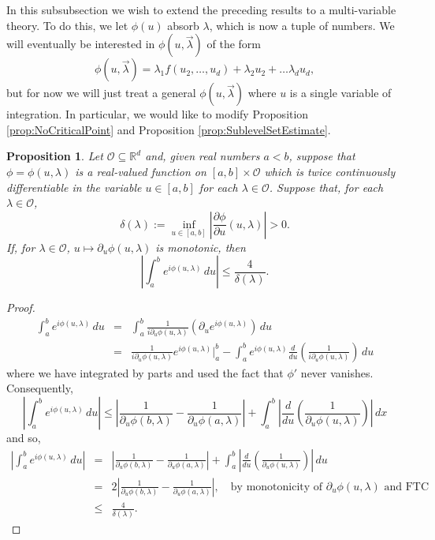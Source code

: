 \documentclass[11pt]{article}
\newtheorem{proposition}[theorem]{Proposition}
\newcommand{\lp}{\left(}
\newcommand{\rp}{\right)}
\newcommand{\p}{\partial}
\newcommand{\f}[2]{\frac{#1}{#2}}
\begin{document}
In this subsubsection we wish to extend the preceding results to a multi-variable theory. To do this, we let $\phi(u)$ absorb $\lambda$, which is now a tuple of numbers. We will eventually be interested in $\phi(u,\vec{\lambda})$ of the form
\begin{equation*}
    \phi(u,\vec{\lambda}) = \lambda_1 f(u_2,\dots,u_d) + \lambda_2 u_2 + \dots \lambda_d u_d,
\end{equation*}
but for now we will just treat a general $\phi(u,\vec{\lambda})$ where $u$ is a single variable of integration. In particular, we would like to modify Proposition \ref{prop:NoCriticalPoint} and Proposition \ref{prop:SublevelSetEstimate}.

\begin{proposition}\label{prop:LambdaNoCriticalPoint} 
Let $\mathcal{O}\subseteq\mathbb{R}^d$ and, given real numbers $a<b$, suppose that $\phi=\phi(u,\lambda)$ is a real-valued function on $[a,b]\times\mathcal{O}$ which is twice continuously differentiable in the variable $u\in [a,b]$ for each $\lambda\in\mathcal{O}$. Suppose that, for each $\lambda\in\mathcal{O}$,
\begin{equation*}
    \delta(\lambda):=\inf_{u\in[a,b]}\left|\frac{\partial \phi}{\partial u}(u,\lambda)\right|>0.
\end{equation*}
If, for $\lambda\in\mathcal{O}$, $u\mapsto \partial_u \phi (u,\lambda)$ is monotonic, then
\begin{equation*}
    \left|\int_a^b e^{i\phi(u,\lambda)}\,du\right|\leq \frac{4}{\delta(\lambda)}.
\end{equation*}
\end{proposition}


\begin{proof}
\begin{eqnarray*}
    \int_{a}^b e^{i \phi(u,\lambda)}\,du  
    &=& \int_{a}^b   \f{1}{i \p_u\phi(u, \lambda)}\lp \p_u e^{i \phi(u,\lambda)}\rp   \,du \\
    &=& \f{1}{i \p_u \phi(u,\lambda)}e^{i \phi(u,\lambda)}\bigg\vert_{a}^b 
    - \int_{a}^b  e^{i \phi(u,\lambda)} \f{d}{du}\lp \f{1}{i \p_u \phi(u,\lambda)} \rp \,du 
\end{eqnarray*}
where we have integrated by parts and used the fact that $\phi'$ never vanishes. Consequently,
\begin{equation*}
    \left|\int_a^b e^{i\phi(u,\lambda)}\,du \right|\leq \left|\frac{1}{\p_u \phi(b,\lambda)}-\frac{1}{\p_u \phi(a,\lambda)}\right|+\int_a^b\left|\frac{d}{du}\left(\frac{1}{\p_u \phi(u,\lambda)}\right)\right|\,dx
\end{equation*}
and so,
\begin{eqnarray*}
    \left|\int_a^b e^{i\phi(u,\lambda)}\,du \right|
    &=&\left|\frac{1}{\p_u \phi(b,\lambda)}-\frac{1}{\p_u \phi(a,\lambda)}\right|+\int_a^b\left|\frac{d}{du}\left(\frac{1}{\p_u \phi(u,\lambda)}\right)\right|\,du \\
    &=& 2\left|\frac{1}{\p_u \phi(b,\lambda)}-\frac{1}{\p_u \phi(a,\lambda)}\right|, \quad \mbox{by monotonicity of $\p_u \phi(u,\lambda)$ and FTC} \\
    &\leq& \f{4}{\delta(\lambda)}.
\end{eqnarray*}
\end{proof}
\end{document}
